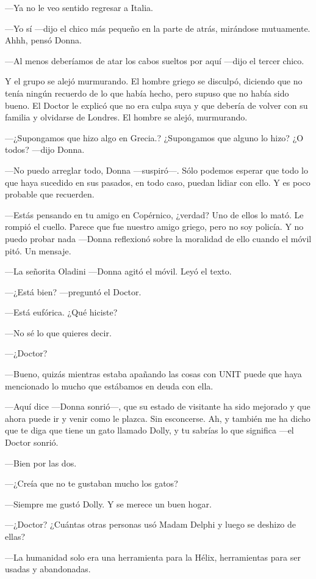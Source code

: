 ---Ya no le veo sentido regresar a Italia.

---Yo sí ---dijo el chico más pequeño en la parte de atrás, mirándose
mutuamente. Ahhh, pensó Donna.

---Al menos deberíamos de atar los cabos sueltos por aquí ---dijo el
tercer chico.

Y el grupo se alejó murmurando. El hombre griego se disculpó, diciendo
que no tenía ningún recuerdo de lo que había hecho, pero supuso que no
había sido bueno. El Doctor le explicó que no era culpa suya y que
debería de volver con su familia y olvidarse de Londres. El hombre se
alejó, murmurando.

---¿Supongamos que hizo algo en Grecia.? ¿Supongamos que alguno lo
hizo? ¿O todos? ---dijo Donna.

---No puedo arreglar todo, Donna ---suspiró---. Sólo podemos esperar que
todo lo que haya sucedido en sus pasados, en todo caso, puedan lidiar
con ello. Y es poco probable que recuerden.

---Estás pensando en tu amigo en Copérnico, ¿verdad? Uno de ellos lo
mató. Le rompió el cuello. Parece que fue nuestro amigo griego, pero no
soy policía. Y no puedo probar nada ---Donna reflexionó sobre la
moralidad de ello cuando el móvil pitó. Un mensaje.

---La señorita Oladini ---Donna agitó el móvil. Leyó el texto.

---¿Está bien? ---preguntó el Doctor.

---Está eufórica. ¿Qué hiciste?

---No sé lo que quieres decir.

---¿Doctor?

---Bueno, quizás mientras estaba apañando las cosas con UNIT puede que
haya mencionado lo mucho que estábamos en deuda con ella.

---Aquí dice ---Donna sonrió---, que su estado de visitante ha sido
mejorado y que ahora puede ir y venir como le plazca. Sin esconcerse.
Ah, y también me ha dicho que te diga que tiene un gato llamado Dolly, y
tu sabrías lo que significa ---el Doctor sonrió.

---Bien por las dos.

---¿Creía que no te gustaban mucho los gatos?

---Siempre me gustó Dolly. Y se merece un buen hogar.

---¿Doctor? ¿Cuántas otras personas usó Madam Delphi y luego se deshizo
de ellas?

---La humanidad solo era una herramienta para la Hélix, herramientas
para ser usadas y abandonadas.

